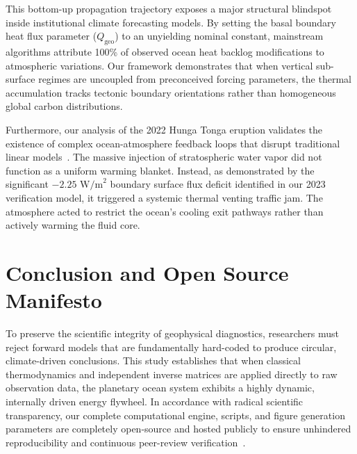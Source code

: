 \documentclass[11pt,a4paper]{article}
\begin{document}
This bottom-up propagation trajectory exposes a major structural blindspot inside institutional climate forecasting models. By setting the basal boundary heat flux parameter ($Q_{\text{geo}}$) to an unyielding nominal constant, mainstream algorithms attribute 100\% of observed ocean heat backlog modifications to atmospheric variations. Our framework demonstrates that when vertical sub-surface regimes are uncoupled from preconceived forcing parameters, the thermal accumulation tracks tectonic boundary orientations rather than homogeneous global carbon distributions.

Furthermore, our analysis of the 2022 Hunga Tonga eruption validates the existence of complex ocean-atmosphere feedback loops that disrupt traditional linear models~\cite{millietal2026}. The massive injection of stratospheric water vapor did not function as a uniform warming blanket. Instead, as demonstrated by the significant $-2.25 \text{ W/m}^2$ boundary surface flux deficit identified in our 2023 verification model, it triggered a systemic thermal venting traffic jam. The atmosphere acted to restrict the ocean's cooling exit pathways rather than actively warming the fluid core.

\section{Conclusion and Open Source Manifesto}
To preserve the scientific integrity of geophysical diagnostics, researchers must reject forward models that are fundamentally hard-coded to produce circular, climate-driven conclusions. This study establishes that when classical thermodynamics and independent inverse matrices are applied directly to raw observation data, the planetary ocean system exhibits a highly dynamic, internally driven energy flywheel. In accordance with radical scientific transparency, our complete computational engine, scripts, and figure generation parameters are completely open-source and hosted publicly to ensure unhindered reproducibility and continuous peer-review verification~\cite{buchanan2026code}.
\end{document}
